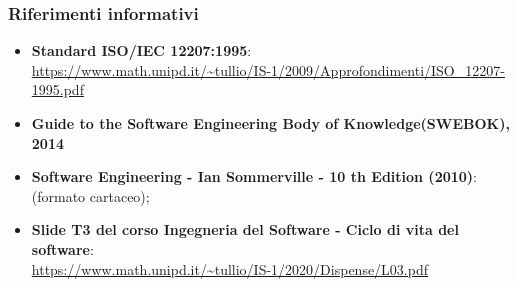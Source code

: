 \subsubsection{Riferimenti informativi}
\begin{itemize}
	\item \textbf{Standard ISO/IEC 12207:1995}: \\
	\textcolor{blue}{\url{https://www.math.unipd.it/~tullio/IS-1/2009/Approfondimenti/ISO_12207-1995.pdf}}
	\item \textbf{Guide to the Software Engineering Body of Knowledge(SWEBOK), 2014} \\
	
	\item \textbf{Software Engineering - Ian Sommerville - 10 th Edition (2010)}: \\
	(formato cartaceo);
	
	\item \textbf{Slide T3 del corso Ingegneria del Software - Ciclo di vita del software}:\\
	\textcolor{blue}{\url{https://www.math.unipd.it/~tullio/IS-1/2020/Dispense/L03.pdf}}
\end{itemize}

